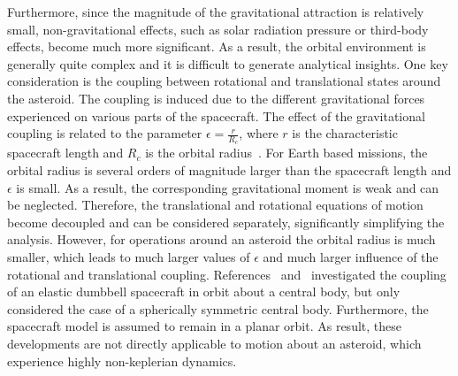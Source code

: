 Furthermore, since the magnitude of the gravitational attraction is relatively small, non-gravitational effects, such as solar radiation pressure or third-body effects, become much more significant.
As a result, the orbital environment is generally quite complex and it is difficult to generate analytical insights.
One key consideration is the coupling between rotational and translational states around the asteroid.
The coupling is induced due to the different gravitational forces experienced on various parts of the spacecraft.
The effect of the gravitational coupling is related to the parameter \(\epsilon = \frac{r}{R_c}\), where \(r\) is the characteristic spacecraft length and \(R_c\) is the orbital radius~\cite{hughes2004}.
For Earth based missions, the orbital radius is several orders of magnitude larger than the spacecraft length and \(\epsilon\) is small.
As a result, the corresponding gravitational moment is weak and can be neglected. 
Therefore, the translational and rotational equations of motion become decoupled and can be considered separately, significantly simplifying the analysis. 
However, for operations around an asteroid the orbital radius is much smaller, which leads to much larger values of \(\epsilon\) and much larger influence of the rotational and translational coupling.
References~\cite{elmasri2005} and~\cite{sanyal2004} investigated the coupling of an elastic dumbbell spacecraft in orbit about a central body, but only considered the case of a spherically symmetric central body.
Furthermore, the spacecraft model is assumed to remain in a planar orbit.
As result, these developments are not directly applicable to motion about an asteroid, which experience highly non-keplerian dynamics.

